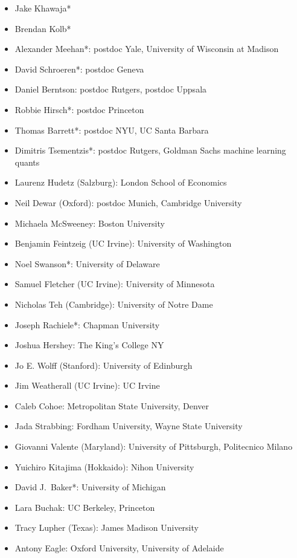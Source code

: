 \documentclass[11pt]{article}
\begin{document}
\begin{itemize}
\item Jake Khawaja*
\item Brendan Kolb*
\item Alexander Meehan*: postdoc Yale, University of Wisconsin at Madison
\item David Schroeren*: postdoc Geneva
\item Daniel Berntson: postdoc Rutgers, postdoc Uppsala
\item Robbie Hirsch*: postdoc Princeton
\item Thomas Barrett*: postdoc NYU, UC Santa Barbara
\item Dimitris Tsementzis*: postdoc Rutgers, Goldman Sachs machine learning quants
\item Laurenz Hudetz (Salzburg): London School of Economics
\item Neil Dewar (Oxford): postdoc Munich, Cambridge University
\item Michaela McSweeney: Boston University
\item Benjamin Feintzeig (UC Irvine): University of Washington
\item Noel Swanson*: University of Delaware
\item Samuel Fletcher (UC Irvine): University of Minnesota
\item Nicholas Teh (Cambridge): University of Notre Dame
\item Joseph Rachiele*: Chapman University
\item Joshua Hershey: The King's College NY
\item Jo E. Wolff (Stanford): University of Edinburgh
\item Jim Weatherall (UC Irvine): UC Irvine
\item Caleb Cohoe: Metropolitan State University, Denver
\item Jada Strabbing: Fordham University, Wayne State University
\item Giovanni Valente (Maryland): University of Pittsburgh, Politecnico Milano
\item Yuichiro Kitajima (Hokkaido): Nihon University
\item David J.\ Baker*: University of Michigan
\item Lara Buchak: UC Berkeley, Princeton
\item Tracy Lupher (Texas): James Madison University
\item Antony Eagle: Oxford University, University of Adelaide
\end{itemize}
\end{document}
